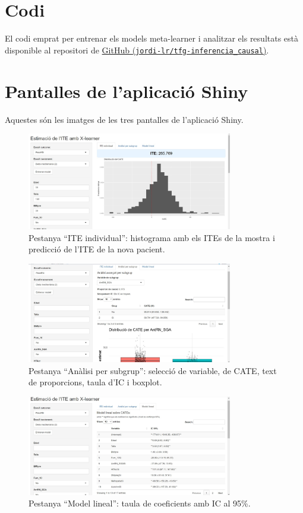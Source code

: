 \documentclass[../main.tex]{subfiles}
\begin{document}
\appendix 

\chapter{Codi} \label{apx: codi}
El codi emprat per entrenar els models meta-learner i analitzar els resultats està disponible al repositori de \href{https://github.com/jordi-lr/tfg-inferencia_causal}{GitHub (\texttt{jordi-lr/tfg-inferencia\_causal})}.

\chapter{Pantalles de l'aplicació Shiny} \label{apx: codi}
Aquestes són les imatges de les tres pantalles de l'aplicació Shiny.

\begin{figure}[htbp]
  \centering
  \includegraphics[width=0.8\textwidth]{imgs/pestanya1_shiny.jpg}
  \caption{Pestanya “ITE individual”: histograma amb els ITEs de la mostra i predicció de l’ITE de la nova pacient.}
  \label{fig:ite_individual}
\end{figure}

\begin{figure}[htbp]
  \centering
  \includegraphics[width=0.8\textwidth]{imgs/pestanya2_shiny.jpg}
  \caption{Pestanya “Anàlisi per subgrup”: selecció de variable, de CATE, text de proporcions, taula d’IC i boxplot.}
  \label{fig:analisi_subgrup}
\end{figure}

\begin{figure}[htbp]
  \centering
  \includegraphics[width=0.8\textwidth]{imgs/pestanya3_shiny.jpg}
  \caption{Pestanya “Model lineal”: taula de coeficients amb IC al 95\%.}
  \label{fig:model_lineal}
\end{figure}
\end{document}
